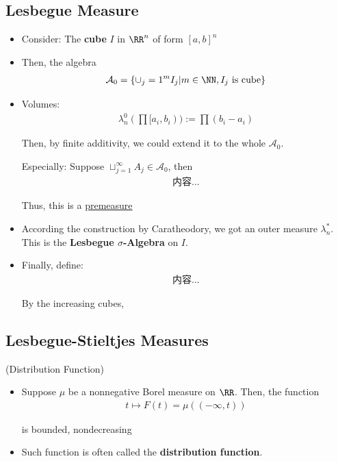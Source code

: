 \documentclass[Total.tex]{subfiles}
\begin{document}
		\subsection{Lesbegue Measure}
		\begin{Def}
			\begin{itemize}
				\item 
				Consider: The \textbf{cube} $I$ in $\RR^n$ of form $[a,b]^n$
				\item Then, the algebra
				\begin{gather*}
					\mathcal{A}_0=\{\cup_j=1^m I_j|m\in \NN,I_j\mbox{ is cube}\}
				\end{gather*}
				\item Volumes:
				\begin{gather*}
					\lambda^0_n(\prod [a_i,b_i)):=\prod (b_i-a_i)
				\end{gather*}
				
				Then, by finite additivity, we could extend it to the whole $\mathcal{A}_0$.
				
				Especially: Suppose $\sqcup_{j=1}^\infty A_j\in \mathcal{A}_0$, then
				\begin{gather*}
					内容...
				\end{gather*}
				
				Thus, this is a \underline{premeasure}
				
				\item According the construction by Caratheodory, we got an outer measure $\lambda^*_n$. This is the \textbf{Lesbegue $\sigma$-Algebra} on $I$.
				
				\item Finally, define:
				\begin{gather*}
					内容...
				\end{gather*}
				
				By the increasing cubes, 
			\end{itemize}
		\end{Def}
		\subsection{Lesbegue-Stieltjes Measures}
		\begin{Def}
			(Distribution Function)
			\begin{itemize}
				\item Suppose $\mu$ be a nonnegative Borel measure on $\RR$. Then, the function
				\begin{gather*}
					t\mapsto F(t)=\mu((-\infty,t))
				\end{gather*}
				
				is bounded, nondecreasing
				
				\item Such function is often called the \textbf{distribution function}.
			\end{itemize}
		\end{Def}
		
\end{document}
